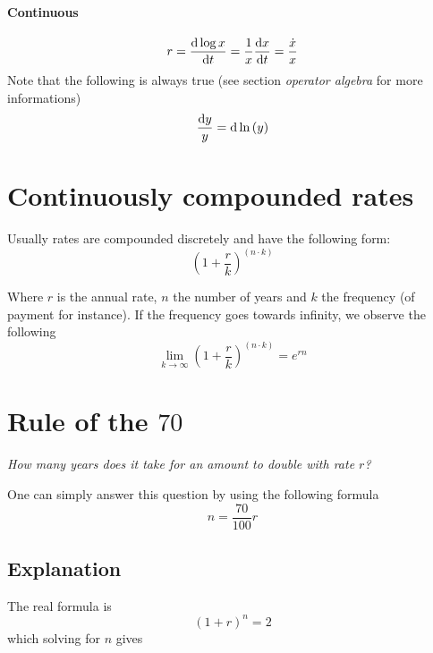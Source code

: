 \documentclass[a4paper] {scrartcl}
\begin{document}
\paragraph{Continuous} %
\label{par:continuous}


\begin{equation}
	r 
	= \frac{{\rm d}\log{x}}{{\rm d}t}
	=
	\frac{1}{x}\frac{{\rm d}x}{{\rm d}t}
	=
	\frac{\dot x}{x}
\end{equation}
Note that the following is always true (see section \emph{operator algebra} for more informations)
\begin{equation}
	\frac{{\rm d}y}{y}={\rm d}\ln{(y)}
\end{equation}


\section{Continuously compounded rates}

Usually rates are compounded discretely and have the following form:
\begin{equation}
	\left(1+\frac{r}{k}\right)^{(n\cdot k)}
\end{equation}

Where $r$ is the annual rate, $n$ the number of years and $k$ the frequency (of payment for instance). If the frequency goes towards infinity, we observe the following
\begin{equation}
	\lim_{k\rightarrow\infty}\left(1+\frac{r}{k}\right)^{(n\cdot k)} = e^{rn}
\end{equation} 

\section{Rule of the $70$}

\emph{How many years does it take for an amount to double with rate $r$?}

One can simply answer this question by using the following formula
\begin{equation}
	n = \frac{70}{100}r
\end{equation}

\subsection{Explanation}
The real formula is
\begin{equation}
	(1+r)^n = 2
\end{equation}
which solving for $n$ gives
\end{document}
